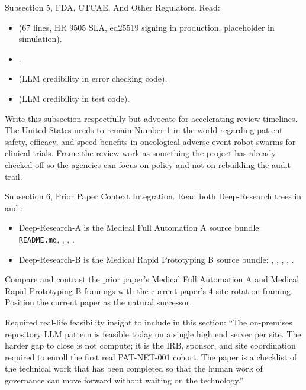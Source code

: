 \begin{sectionaccent}
Subsection 5, FDA, CTCAE, And Other Regulators. Read:
\begin{itemize}
  \item {}
        (67 lines, HR 9505 SLA, ed25519 signing in production,
        placeholder in simulation).
  \item {}.
  \item {}
        (LLM credibility in error checking code).
  \item {}
        (LLM credibility in test code).
\end{itemize}
Write this subsection respectfully but advocate for accelerating
review timelines. The United States needs to remain Number 1 in the
world regarding patient safety, efficacy, and speed benefits in
oncological adverse event robot swarms for clinical trials. Frame the
review work as something the project has already checked off so the
agencies can focus on policy and not on rebuilding the audit trail.

Subsection 6, Prior Paper Context Integration. Read both Deep-Research
trees in
 and
:
\begin{itemize}
  \item Deep-Research-A is the Medical Full Automation A source
        bundle: \texttt{README.md},
        ,
        ,
        .
  \item Deep-Research-B is the Medical Rapid Prototyping B source
        bundle: ,
        ,
        ,
        ,
        .
\end{itemize}
Compare and contrast the prior paper's Medical Full Automation A and
Medical Rapid Prototyping B framings with the current paper's 4 site
rotation framing. Position the current paper as the natural successor.

Required real-life feasibility insight to include in this section:
``The on-premises repository LLM pattern is feasible today on a single
high end server per site. The harder gap to close is not compute; it
is the IRB, sponsor, and site coordination required to enroll the
first real PAT-NET-001 cohort. The paper is a checklist of the
technical work that has been completed so that the human work of
governance can move forward without waiting on the technology.''


\end{sectionaccent}
